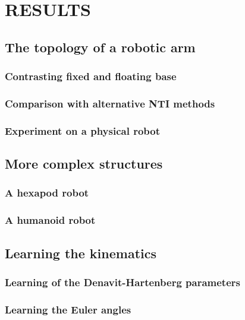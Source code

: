 \documentclass{article}
\begin{document}
\section{RESULTS}
\subsection{The topology of a robotic arm}
\subsubsection{Contrasting fixed and floating base}
\subsubsection{Comparison with alternative NTI methods}
\subsubsection{Experiment on a physical robot}
\subsection{More complex structures}
\subsubsection{A hexapod robot}
\subsubsection{A humanoid robot}
\subsection{Learning the kinematics}
\subsubsection{Learning of the Denavit-Hartenberg parameters}
\subsubsection{Learning the Euler angles}
\end{document}
